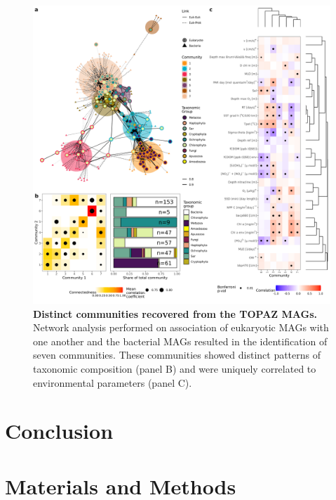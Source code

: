 \documentclass[12pt]{article}
\numberwithin{equation}{section}
\begin{document}

\begin{figure}[h!]    %
    \centering
    \includegraphics[width = \columnwidth]{figures/Figure6_Networks.png}
    \caption{ \textbf{Distinct communities recovered from the TOPAZ MAGs.} Network analysis performed on association of eukaryotic MAGs with one another and the bacterial MAGs resulted in the identification of seven communities. These communities showed distinct patterns of taxonomic composition (panel B) and were uniquely correlated to environmental parameters (panel C).}
    \label{fig:fig6-network}
\end{figure}


\section*{Conclusion}
\section*{Materials and Methods}
\end{document}
